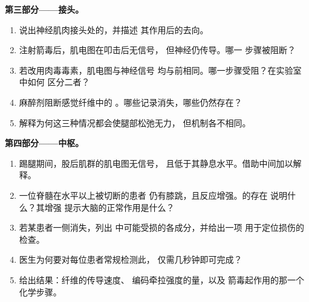 \begin{problem}
\medskip
\noindent\textbf{第三部分——接头。}
\begin{enumerate}[resume]
  \item 说出神经肌肉接头处的，并描述
        其作用后的去向。
  \item 注射箭毒后，肌电图在叩击后无信号，
        但神经仍传导。哪一
        步骤被阻断？
  \item 若改用肉毒毒素，肌电图与神经信号
        均与前相同。哪一步骤受阻？在实验室中如何
        区分二者？
  \item 麻醉剂阻断感觉纤维中的
        。哪些记录消失，哪些仍然存在？
  \item 解释为何这三种情况都会使腿部松弛无力，
        但机制各不相同。
\end{enumerate}

\medskip
\noindent\textbf{第四部分——中枢。}
\begin{enumerate}[resume]
  \item 踢腿期间，股后肌群的肌电图无信号，
        且低于其静息水平。借助中间加以解释。
  \item 一位脊髓在水平以上被切断的患者
        仍有膝跳，且反应增强。的存在
        说明什么？其增强
        提示大脑的正常作用是什么？
  \item 若某患者一侧消失，列出
        中可能受损的各成分，并给出一项
        用于定位损伤的检查。
  \item 医生为何要对每位患者常规检测此，
        仅需几秒钟即可完成？
  \item 给出结果：纤维的传导速度、
        编码牵拉强度的量，以及
        箭毒起作用的那一个化学步骤。
\end{enumerate}
\end{problem}
